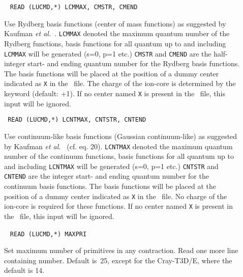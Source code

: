 \begin{description}
\item[]\verb| |\newline
\verb|READ (LUCMD,*) LCMMAX, CMSTR, CMEND|

Use Rydberg basis functions
(center of mass functions) as suggested by
Kaufman {\it et al.\/}~\cite{kkwbmjjpbamop22}. \verb|LCMMAX| denoted
the maximum quantum number of the Rydberg functions, basis functions
for all quantum up to and including \verb|LCMMAX| will be generated
(s=0, p=1 etc.) \verb|CMSTR| and \verb|CMEND| are the half-integer
start- and ending quantum number for the Rydberg basis functions. The
basis functions will be placed at the position of a dummy center
indicated as \verb|X| in the \molinp\ file. The charge of
the ion-core is determined by the keyword  (default: +1).
If no center named \verb|X| is present in the \molinp\ file,
this input will be ignored.

\item[]\verb| |\newline
\verb|READ (LUCMD,*) LCNTMAX, CNTSTR, CNTEND|

%
%
Use continuum-like basis functions
(Gaussian continuum-like) as suggested by
Kaufman {\it et al.\/}~\cite{kkwbmjjpbamop22} (cf. eq. 20). \verb|LCNTMAX| denoted
the maximum quantum number of the continuum functions, basis functions
for all quantum up to and including \verb|LCNTMAX| will be generated
(s=0, p=1 etc.) \verb|CNTSTR| and \verb|CNTEND| are the integer
start- and ending quantum number for the continuum basis functions. The
basis functions will be placed at the position of a dummy center
indicated as \verb|X| in the \molinp\ file. 
No charge of the ion-core is required for these functions.
If no center named \verb|X| is present in the \molinp\ file,
this input will be ignored.

\item[]\verb| |\newline
\verb|READ (LUCMD,*) MAXPRI|

Set maximum number of primitives in any
contraction.  Read one more line containing number.  Default
is~25, except for the Cray-T3D/E, where the default is 14.



\end{description}
